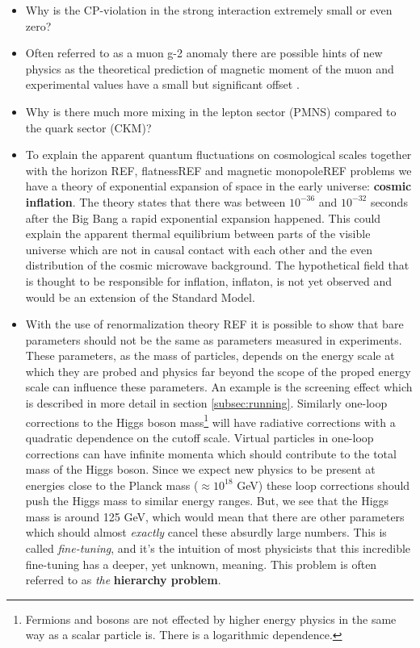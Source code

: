 \begin{itemize}
\item Why is the CP-violation in the strong interaction extremely small or even zero?
\item Often referred to as a muon g-2 anomaly there are possible hints of new physics as the theoretical prediction of magnetic moment of the muon and experimental values have a small but significant offset \cite{Holzbauer:2017ntd}.
\item Why is there much more mixing in the lepton sector (PMNS) compared to the quark sector (CKM)? 
\item To explain the apparent quantum fluctuations on cosmological scales together with the horizon REF, flatnessREF and magnetic monopoleREF problems we have a theory of exponential expansion of space in the early universe: \textbf{cosmic inflation}. The theory states that there was between $10^{-36}$ and $10^{-32}$ seconds after the Big Bang a rapid exponential expansion happened. This could explain the apparent thermal equilibrium between parts of the visible universe which are not in causal contact with each other and the even distribution of the cosmic microwave background. The hypothetical field that is thought to be responsible for inflation, inflaton, is not yet observed and would be an extension of the Standard Model.
\item With the use of renormalization theory REF it is possible to show that bare parameters should not be the same as parameters measured in experiments. These parameters, as the mass of particles, depends on the energy scale at which they are probed and physics far beyond the scope of the proped energy scale can influence these parameters. An example is the screening effect which is described in more detail in section \ref{subsec:running}. Similarly one-loop corrections to the Higgs boson mass\footnote{Fermions and bosons are not effected by higher energy physics in the same way as a scalar particle is. There is a logarithmic dependence.} will have radiative corrections with a quadratic dependence on the cutoff scale. Virtual particles in one-loop corrections can have infinite momenta which should contribute to the total mass of the Higgs boson. Since we expect new physics to be present at energies close to the Planck mass ($\approx 10^{18}$ GeV) these loop corrections should push the Higgs mass to similar energy ranges. But, we see that the Higgs mass is around 125 GeV, which would mean that there are other parameters which should almost \textit{exactly} cancel these absurdly large numbers. This is called \textit{fine-tuning}, and it's the intuition of most physicists that this incredible fine-tuning has a deeper, yet unknown, meaning. This problem is often referred to as \textit{the} \textbf{hierarchy problem}.
\end{itemize}




